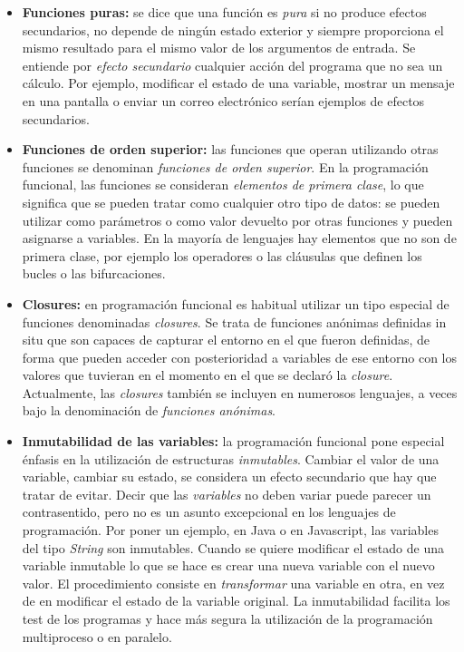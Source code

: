 \begin{itemize}
   \item \textbf{Funciones puras:} se dice que una función es \textit{pura} si no produce efectos secundarios, no depende de ningún estado exterior y siempre proporciona el mismo resultado para el mismo valor de los argumentos de entrada. Se entiende por \textit{efecto secundario} cualquier acción del programa que no sea un cálculo. Por ejemplo, modificar el estado de una variable, mostrar un mensaje en una pantalla o enviar un correo electrónico serían ejemplos de efectos secundarios.
   \item \textbf{Funciones de orden superior:} las funciones que operan utilizando otras funciones se denominan \textit{funciones de orden superior}. En la programación funcional, las funciones se consideran \textit{elementos de primera clase}, lo que significa que se pueden tratar como cualquier otro tipo de datos: se pueden utilizar como parámetros o como valor devuelto por otras funciones y pueden asignarse a variables. En la mayoría de lenguajes hay elementos que no son de primera clase, por ejemplo los operadores o las cláusulas que definen los bucles o las bifurcaciones.
   \item \textbf{Closures:} en programación funcional es habitual utilizar un tipo especial de funciones denominadas \textit{closures}. Se trata de funciones anónimas definidas in situ que son capaces de capturar el entorno en el que fueron definidas, de forma que pueden acceder con posterioridad a variables de ese entorno con los valores que tuvieran en el momento en el que se declaró la \textit{closure}. Actualmente, las \textit{closures} también se incluyen en numerosos lenguajes, a veces bajo la denominación de \textit{funciones anónimas}.
   \item \textbf{Inmutabilidad de las variables:} la programación funcional pone especial énfasis en la utilización de estructuras \textit{inmutables}. Cambiar el valor de una variable, cambiar su estado, se considera un efecto secundario que hay que tratar de evitar. Decir que las \textit{variables} no deben variar puede parecer un contrasentido, pero no es un asunto excepcional en los lenguajes de programación. Por poner un ejemplo, en Java o en Javascript, las variables del tipo \textit{String} son inmutables. Cuando se quiere modificar el estado de una variable inmutable lo que se hace es crear una nueva variable con el nuevo valor. El procedimiento consiste en \textit{transformar} una variable en otra, en vez de en modificar el estado de la variable original. La inmutabilidad facilita los test de los programas y hace más segura la utilización de la programación multiproceso o en paralelo.

\end{itemize}
